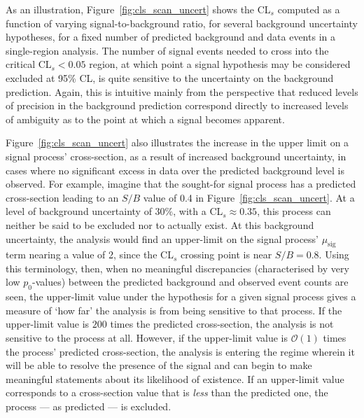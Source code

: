 As an illustration, Figure~\ref{fig:cls_scan_uncert} shows the CL$_s$ computed as a function of varying signal-to-background ratio, for several background uncertainty hypotheses,
for a fixed number of predicted background and data events in a single-region analysis.
The number of signal events needed to cross into the critical CL$_s <0.05$ region,
at which point a signal hypothesis may be considered excluded at 95\% CL, is quite sensitive to the uncertainty
on the background prediction.
Again, this is intuitive mainly from the perspective that reduced levels of precision
in the background prediction correspond directly to increased levels of ambiguity 
as to the point at which a signal becomes apparent.

Figure~\ref{fig:cls_scan_uncert} also illustrates the increase in the upper limit
on a signal process' cross-section, as a result of increased background uncertainty,
in cases where no significant excess in data over the predicted background level is observed.
For example, imagine that the sought-for signal process has a predicted cross-section leading to an
$S/B$ value of 0.4 in Figure~\ref{fig:cls_scan_uncert}.
At a level of background uncertainty of $30\%$, with a CL$_s \approx 0.35$, this process can neither be said
to be excluded nor to actually exist.
At this background uncertainty, the analysis would find an upper-limit on the signal process' $\mu_{\text{sig}}$ term nearing a value of 2,
since the CL$_s$ crossing point is near $S/B = 0.8$.
Using this terminology, then, when no meaningful discrepancies (characterised by very low $p_0$-values) between the predicted background and observed event counts
are seen, the upper-limit value under the hypothesis for a
given signal process gives a measure of `how far' the analysis is from being sensitive to that process.
If the upper-limit value is $200$ times the predicted cross-section, the analysis is not sensitive to the process at all.
However, if the upper-limit value is $\mathcal{O}(1)$ times the process' predicted cross-section, the analysis
is entering the regime wherein it will be able to resolve the presence of the signal and can begin to make meaningful statements about
its likelihood of existence.
If an upper-limit value corresponds to a cross-section value that is \textit{less} than the predicted one,
the process --- as predicted --- is excluded.

